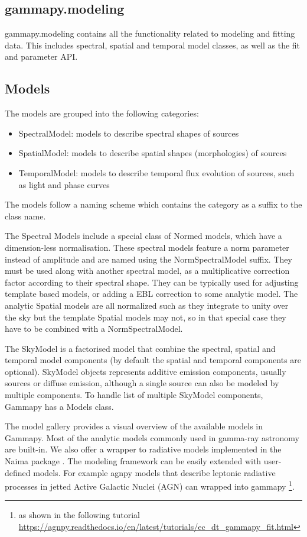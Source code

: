 \subsection{gammapy.modeling}
\label{ssec:gammapy-modeling}

gammapy.modeling contains all the functionality related to modeling and fitting data. This includes spectral, spatial and temporal model classes, as well as the fit and parameter API.

\subsection{Models}
\label{ssec:models}

The models are grouped into the following categories:
\begin{itemize}
\item SpectralModel: models to describe spectral shapes of sources
\item SpatialModel: models to describe spatial shapes (morphologies) of sources
\item TemporalModel: models to describe temporal flux evolution of sources, such as light and phase curves
\end{itemize}
The models follow a naming scheme which contains the category as a suffix to the class name.

The  Spectral Models include a special class of Normed models, which have a dimension-less normalisation. These spectral models feature a norm parameter instead of amplitude and are named using the NormSpectralModel suffix. They must be used along with another spectral model, as a multiplicative correction factor according to their spectral shape. They can be typically used for adjusting template based models, or adding a EBL correction to some analytic model. The analytic Spatial models are all normalized such as they integrate to unity over the sky but the template Spatial models may not, so in that special case they have to be combined with a NormSpectralModel.

The SkyModel is a factorised model that combine the spectral, spatial and temporal model components (by default the spatial and temporal components are optional).
SkyModel objects represents additive emission components, usually sources or diffuse emission, although a single source can also be modeled by multiple components.
To handle list of multiple SkyModel components, Gammapy has a Models class.

The model gallery provides a visual overview of the available models in Gammapy.
Most of the analytic models  commonly used in gamma-ray astronomy are built-in. We also offer a wrapper to radiative models implemented in the Naima package \cite{naima}. The modeling framework can be easily extended with user-defined models. For example agnpy \citep{cosimo_nigro_2021_5762147} models that describe leptonic radiative processes in jetted Active Galactic Nuclei (AGN) can wrapped into gammapy \footnote{as shown in the following tutorial \url{ https://agnpy.readthedocs.io/en/latest/tutorials/ec_dt_gammapy_fit.html}}.

